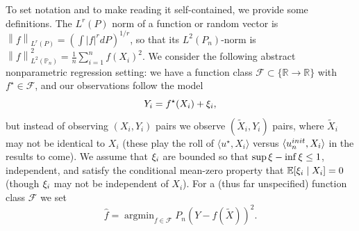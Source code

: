 \documentclass[11pt]{article}
\newcommand{\E}{\mathbb{E}}
\newcommand{\Prb}{\mathbb{P}}
\newcommand{\R}{\mathbb{R}} %
\newcommand{\mc}[1]{\mathcal{#1}}
\newcommand{\norm}[1]{\left\|{#1}\right\|} %
\newcommand{\what}[1]{\widehat{#1}}
\newcommand{\wt}[1]{\widetilde{#1}}
\newcommand{\<}{\langle} %
\renewcommand{\>}{\rangle}
\DeclareMathOperator*{\argmin}{argmin}
\newcommand{\LtwoPn}[1]{\norm{#1}_{L^2(\Prb_n)}}
\newcommand{\opt}{^\star}
\begin{document}
To set notation and to make reading it self-contained, we provide some
definitions. The $L^r(P)$ norm of a function or random vector is
$\norm{f}_{L^r(P)} = (\int |f|^r dP)^{1/r}$, so that its $L^2(P_n)$-norm is
$\LtwoPn{f}^2 = \frac{1}{n} \sum_{i = 1}^n f(X_i)^2$.  We consider the
following abstract nonparametric regression setting: we have a function
class $\mc{F} \subset \{\R \to \R\}$ with $f\opt \in \mc{F}$, and our
observations follow the model
\begin{equation}
  \label{eqn:nonparametric-model}
  Y_i = f\opt(X_i) + \noise_i,
\end{equation}
but instead of observing $(X_i, Y_i)$ pairs we observe $(\wt{X}_i, Y_i)$
pairs, where $\wt{X}_i$ may not be identical to $X_i$ (these play the roll
of $\<u\opt, X_i\>$ versus $\<\uinit, X_i\>$ in the results to come).  We
assume that $\xi_i$ are bounded so that $\sup \xi - \inf \xi \le
1$, independent, and satisfy the conditional mean-zero property that
$\E[\noise_i \mid X_i] = 0$ (though $\xi_i$ may not be independent of
$X_i$).  For a (thus far unspecified) function class $\mc{F}$ we set
\begin{equation*}
  \what{f} = \argmin_{f \in \mc{F}} P_n(Y - f(\wt{X}))^2.
\end{equation*}
\end{document}
